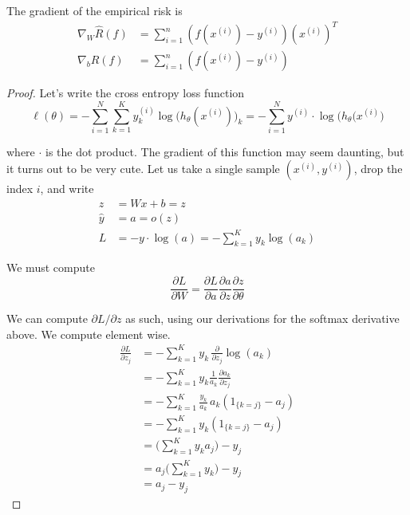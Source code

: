   \begin{theorem}
    \label{thm:gradient-of-softmax-loss}
    The gradient of the empirical risk is 
    \begin{align}
      \nabla_W \hat{R}(f) & = \sum_{i=1}^n (f(x^{(i)}) - y^{(i)}) (x^{(i)})^T \\ 
      \nabla_b \hat{R}(f) & = \sum_{i=1}^n (f(x^{(i)}) - y^{(i)})
    \end{align}
  \end{theorem}
  \begin{proof}
    Let's write the cross entropy loss function 
    \begin{equation}
      \ell (\theta) = - \sum_{i=1}^N \sum_{k=1}^K y^{(i)}_k \log \big( h_{\theta} (x^{(i)})\big)_k = - \sum_{i=1}^N y^{(i)} \cdot \log \big( h_{\theta} (x^{(i)} \big)
    \end{equation}
   
    where $\cdot$ is the dot product. The gradient of this function may seem daunting, but it turns out to be very cute. Let us take a single sample $(x^{(i)}, y^{(i)})$, drop the index $i$, and write
    \begin{align}
      z & = W x + b = z \\
      \hat{y} & = a = o (z) \\
      L & = - y \cdot \log (a) = - \sum_{k=1}^K y_k \log(a_k)
    \end{align}
   
    We must compute 
    \begin{equation}
      \frac{\partial L}{\partial W} = \frac{\partial L}{\partial a} \frac{\partial a}{\partial z} \frac{\partial z}{\partial \theta}
    \end{equation}
   
    We can compute $\partial L /\partial z$ as such, using our derivations for the softmax derivative above. We compute element wise. 
    \begin{align}
      \frac{\partial L}{\partial z_j} & = - \sum_{k=1}^K y_k \, \frac{\partial}{\partial z_j} \log (a_k) \\
      & = - \sum_{k=1}^K y_k \frac{1}{a_k} \frac{\partial a_k}{\partial z_j} \\
      & = - \sum_{k=1}^K \frac{y_k}{a_k} \, a_k (1_{\{k = j\}} - a_j) \\
      & = - \sum_{k=1}^K y_k (1_{\{k = j\}} - a_j) \\
      & = \bigg( \sum_{k=1}^K y_k a_j \bigg) - y_j \\
      & = a_j \bigg( \sum_{k=1}^K y_k \bigg) - y_j \\
      & = a_j - y_j
    \end{align}
   

\end{proof}
